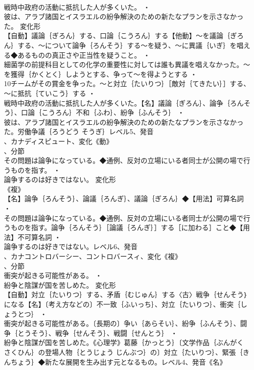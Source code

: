 \documentclass[8pt]{extreport}
\begin{document}
\begin{CJK}{UTF8}{min}
\\	戦時中政府の活動に抵抗した人が多くいた。 ・
\\	彼は、アラブ諸国とイスラエルの紛争解決のための新たなプランを示さなかった。	変化形 
\\	【自動】議論｛ぎろん｝する、口論｛こうろん｝する【他動】～を議論｛ぎろん｝する、～について論争｛ろんそう｝する～を疑う、～に異議｛いぎ｝を唱える◆あるものの真正さや正当性を疑うこと。 ・
\\	細菌学の前提科目としての化学の重要性に対しては誰も異議を唱えなかった。～を獲得｛かくとく｝しようとする、争って～を得ようとする ・
\\	10チームがその賞金を争った。～と対立｛たいりつ｝［敵対｛てきたい｝］する、～に抵抗｛ていこう｝する ・
\\	戦時中政府の活動に抵抗した人が多くいた。【名】議論｛ぎろん｝、論争｛ろんそう｝、口論｛こうろん｝不和｛ふわ｝、紛争｛ふんそう｝ ・
\\	彼は、アラブ諸国とイスラエルの紛争解決のための新たなプランを示さなかった。労働争議｛ろうどう そうぎ｝レベル5、発音
\\	、カナディスピュート、変化《動》
\\	、分節
\\	その問題は論争になっている。◆通例、反対の立場にいる者同士が公開の場で行うものを指す。 ・
\\	論争するのは好きではない。	変化形 
\\	《複》
\\	【名】論争｛ろんそう｝、論議｛ろんぎ｝、議論｛ぎろん｝◆【用法】可算名詞 ・
\\	その問題は論争になっている。◆通例、反対の立場にいる者同士が公開の場で行うものを指す。論争｛ろんそう｝［論議｛ろんぎ｝］する［に加わる］こと◆【用法】不可算名詞 ・
\\	論争するのは好きではない。レベル6、発音
\\	、カナコントロバーシー、コントロバースィ、変化《複》
\\	、分節
\\	衝突が起きる可能性がある。 ・
\\	紛争と陰謀が国を苦しめた。	変化形 
\\	【自動】対立｛たいりつ｝する、矛盾｛むじゅん｝する〈古〉戦争｛せんそう｝になる【名】〔考え方などの〕不一致｛ふいっち｝、対立｛たいりつ｝、衝突｛しょうとつ｝ ・
\\	衝突が起きる可能性がある。〔長期の〕争い｛あらそい｝、紛争｛ふんそう｝、闘争｛とうそう｝、戦争｛せんそう｝、戦闘｛せんとう｝ ・
\\	紛争と陰謀が国を苦しめた。《心理学》葛藤｛かっとう｝〔文学作品｛ぶんがく さくひん｝の登場人物｛とうじょう じんぶつ｝の〕対立｛たいりつ｝、緊張｛きんちょう｝◆新たな展開を生み出す元となるもの。レベル4、発音《名》

\end{CJK}
\end{document}

